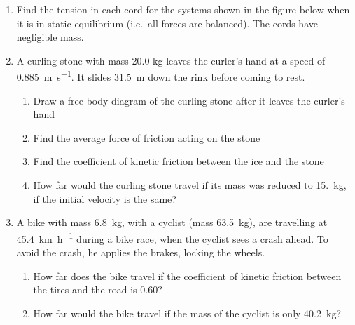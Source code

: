 \begin{enumerate}[itemsep=6pt]
\item Find the tension in each cord for the systems shown in the figure below
  when it is in static equilibrium (i.e.\ all forces are balanced). The cords
  have negligible mass.
  \begin{center}
  \end{center}
  
\item A curling stone with mass 20.0 kg leaves the curler's hand at a speed of
  \SI{.885}{\metre\per\second}. It slides \SI{31.5}{\metre} down the rink
  before coming to rest. 
  \begin{enumerate}[itemsep=3pt]
  \item Draw a free-body diagram of the curling stone after it leaves the
    curler's hand
  \item Find the average force of friction acting on the stone
  \item Find the coefficient of kinetic friction between the ice and the stone
  \item How far would the curling stone travel if its mass was reduced to
    \SI{15.}{\kilo\gram}, if the initial velocity is the same?
  \end{enumerate}

\item A bike with mass \SI{6.8}{\kilo\gram}, with a cyclist (mass
  \SI{63.5}{\kilo\gram}), are travelling at \SI{45.4}{\kilo\metre\per\hour}
  during a bike race, when the cyclist sees a crash ahead. To avoid the crash,
  he applies the brakes, locking the wheels.
  \begin{enumerate}
  \item How far does the bike travel if the coefficient of kinetic friction
    between the tires and the road is 0.60?
  \item How far would the bike travel if the mass of the cyclist is only
    \SI{40.2}{\kilo\gram}?
  \end{enumerate}
  

\end{enumerate}
